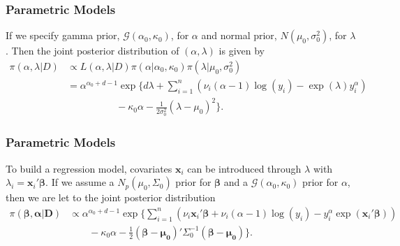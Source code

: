 \documentclass{beamer}
\begin{document}
	\begin{frame}
		\frametitle{Parametric Models}
		If we specify gamma prior, $\mathcal{G}(\alpha_0, \kappa_0)$, for $\alpha$ and normal prior, $N(\mu_0, \sigma_0 ^ 2)$, for $\lambda$. Then the joint posterior distribution of $(\alpha, \lambda)$ is given by
		\begin{equation*}
			\begin{split}
				\pi(\alpha, \lambda | D) & \propto L(\alpha, \lambda | D) \pi(\alpha | \alpha_0, \kappa_0)\pi(\lambda | \mu_0, \sigma_0 ^ 2) \\
				& = \alpha ^ {\alpha_0 + d - 1} \exp\{d\lambda + \sum_{i = 1}^{n}(\nu_i(\alpha - 1)\log(y_i) - \exp(\lambda)y_i ^ {\alpha}) \\ 
				& \quad\quad\quad\quad\quad - \kappa_0\alpha - \frac{1}{2\sigma_0 ^ 2}(\lambda - \mu_0) ^ 2\}.
			\end{split}
		\end{equation*}
	\end{frame}
	
	\begin{frame}
		\frametitle{Parametric Models}
		To build a regression model, covariates $\boldsymbol{x}_i$ can be introduced through $\lambda$ with $\lambda_i = \boldsymbol{x}_i'\boldsymbol{\beta}$. If we assume a $N_p(\mu_0, \Sigma_0)$ prior for $\boldsymbol{\beta}$ and a $\mathcal{G}(\alpha_0, \kappa_0)$ prior for $\alpha$, then we are let to the joint posterior distribution
		\begin{equation*}
			\begin{split}
				\pi(\boldsymbol{\beta, \alpha | D}) & \propto \alpha ^ {\alpha_0 + d - 1}\exp\{\sum_{i = 1}^{n}(\nu_i\boldsymbol{x}_i'\boldsymbol{\beta} + \nu_i(\alpha - 1)\log(y_i) - y_i ^ {\alpha}\exp( \boldsymbol{x}_i'\boldsymbol{\beta})) \\
				& \quad\quad - \kappa_0\alpha - \frac{1}{2}(\boldsymbol{\beta} - \boldsymbol{\mu_0})' \Sigma_0 ^ {-1}(\boldsymbol{\beta} - \boldsymbol{\mu_0})\}.			
			\end{split}
		\end{equation*}
	\end{frame}

	\begin{frame}[allowframebreaks]
		\begin{singlespace}
			
			
		\end{singlespace}
	\end{frame}
	
\end{document}
